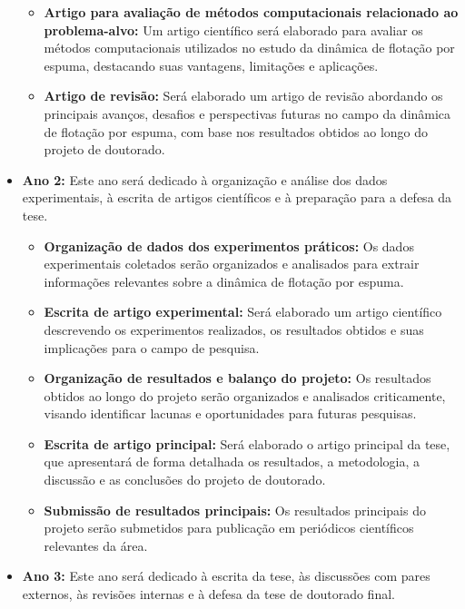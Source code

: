 \documentclass[12pt]{article}
\begin{document}
\begin{itemize}
\begin{itemize}
    \item \textbf{Artigo para avaliação de métodos computacionais relacionado ao problema-alvo:} Um artigo científico será elaborado para avaliar os métodos computacionais utilizados no estudo da dinâmica de flotação por espuma, destacando suas vantagens, limitações e aplicações.
    
    \item \textbf{Artigo de revisão:} Será elaborado um artigo de revisão abordando os principais avanços, desafios e perspectivas futuras no campo da dinâmica de flotação por espuma, com base nos resultados obtidos ao longo do projeto de doutorado.
\end{itemize}

\item \textbf{Ano 2:} Este ano será dedicado à organização e análise dos dados experimentais, à escrita de artigos científicos e à preparação para a defesa da tese.

\begin{itemize}
    \item \textbf{Organização de dados dos experimentos práticos:} Os dados experimentais coletados serão organizados e analisados para extrair informações relevantes sobre a dinâmica de flotação por espuma.
    
    \item \textbf{Escrita de artigo experimental:} Será elaborado um artigo científico descrevendo os experimentos realizados, os resultados obtidos e suas implicações para o campo de pesquisa.
    
    \item \textbf{Organização de resultados e balanço do projeto:} Os resultados obtidos ao longo do projeto serão organizados e analisados criticamente, visando identificar lacunas e oportunidades para futuras pesquisas.
    
    \item \textbf{Escrita de artigo principal:} Será elaborado o artigo principal da tese, que apresentará de forma detalhada os resultados, a metodologia, a discussão e as conclusões do projeto de doutorado.
    
    \item \textbf{Submissão de resultados principais:} Os resultados principais do projeto serão submetidos para publicação em periódicos científicos relevantes da área.
\end{itemize}

\item \textbf{Ano 3:} Este ano será dedicado à escrita da tese, às discussões com pares externos, às revisões internas e à defesa da tese de doutorado final.


\end{itemize}
\end{document}
